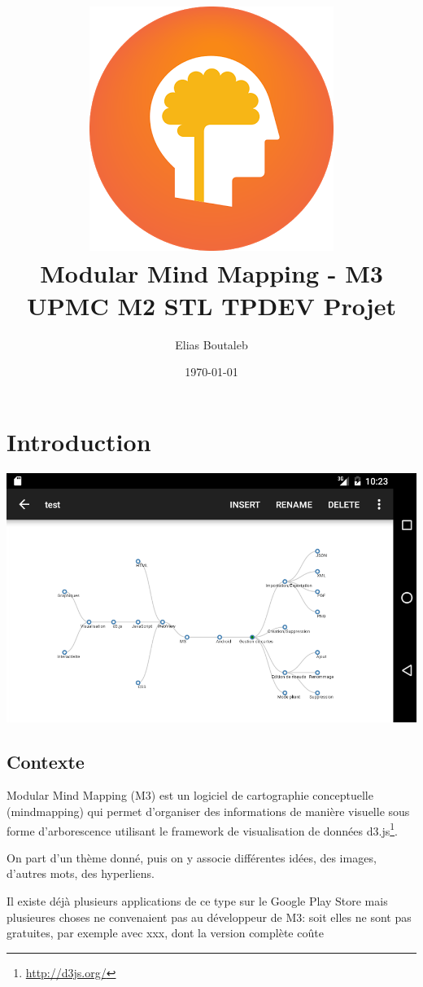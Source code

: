 \documentclass[11pt,a4paper,margin=0.5in]{report}
\title{ \includegraphics[scale=0.33]{m3.png} \\[0.25in]Modular Mind Mapping - M3 \\ UPMC M2 STL TPDEV Projet}
\author{Elias Boutaleb}
\date{\today}
\begin{document}
\maketitle
\tableofcontents

\chapter{Introduction}

\begin{center}
\includegraphics[scale=0.5]{mm.png} \\[0.25in]
\end{center}

\section{Contexte}

Modular Mind Mapping (M3) est un logiciel de cartographie conceptuelle (mindmapping) qui permet d'organiser des informations de manière
visuelle sous forme d'arborescence utilisant le framework de visualisation de données d3.js\footnote{\url{http://d3js.org/}}.

On part d'un thème donné, puis on y associe différentes idées, des images, d'autres mots, des hyperliens.

\clearpage

Il existe déjà plusieurs applications de ce type sur le Google Play Store mais plusieures choses ne convenaient
pas au développeur de M3:
soit elles ne sont pas gratuites, par exemple avec xxx, dont la version complète coûte \\
\end{document}
